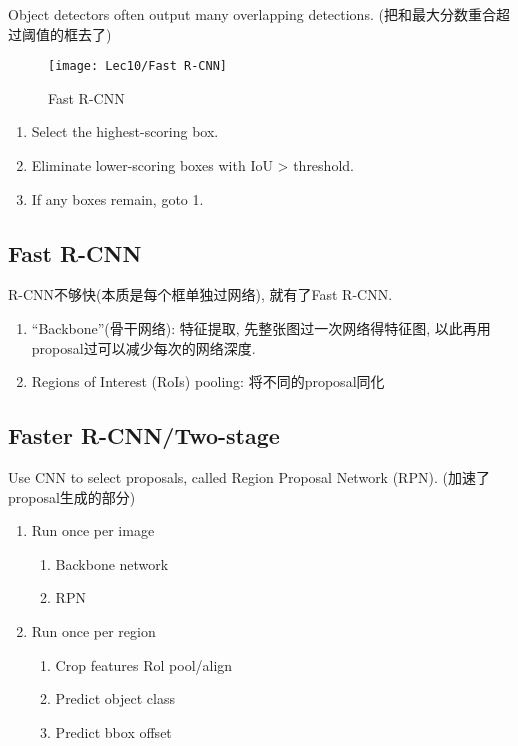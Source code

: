 Object detectors often output many overlapping detections. (把和最大分数重合超过阈值的框去了) 

\begin{wrapfigure}[10]{r}{0.48\textwidth}
    \centering
    \texttt{[image: Lec10/Fast R-CNN]}
    \caption{Fast R-CNN}
\end{wrapfigure}

\quad

\begin{enumerate}
    \item Select the highest-scoring box.
    \item Eliminate lower-scoring boxes with IoU > threshold.
    \item If any boxes remain, goto 1. 
\end{enumerate}

\subsection{Fast R-CNN}

R-CNN不够快(本质是每个框单独过网络), 就有了Fast R-CNN.

\begin{enumerate}
    \item ``Backbone''(骨干网络): 特征提取, 先整张图过一次网络得特征图, 以此再用proposal过可以减少每次的网络深度.
    \item Regions of Interest (RoIs) pooling: 将不同的proposal同化
\end{enumerate}

\subsection{Faster R-CNN/Two-stage}
Use CNN to select proposals, called Region Proposal Network (RPN). (加速了proposal生成的部分)

\begin{enumerate}
    \item Run once per image
    \begin{enumerate}
        \item Backbone network
        \item RPN
    \end{enumerate}
    \item Run once per region
    \begin{enumerate}
        \item Crop features Rol pool/align
        \item Predict object class
        \item Predict bbox offset
    \end{enumerate}
\end{enumerate}

